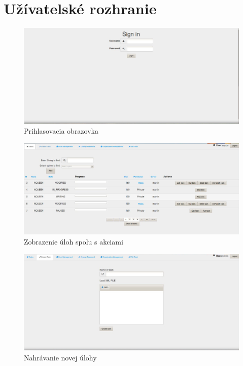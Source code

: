\chapter{Užívatelské rozhranie}
{
	\begin{figure}[htb]

\begin{center}

\includegraphics[scale=0.5]{page5.jpg} 
\caption{Prihlasovacia obrazovka }


\end{center}

\end{figure}


\begin{figure}[htb]

\begin{center}

\includegraphics[scale=0.5]{page.jpg} 
\caption{Zobrazenie úloh spolu s akciami }


\end{center}

\end{figure}



\begin{figure}[htb]

\begin{center}

\includegraphics[scale=0.5]{page1.jpg} 
\caption{Nahrávanie novej úlohy}



\end{center}
\end{figure}}
